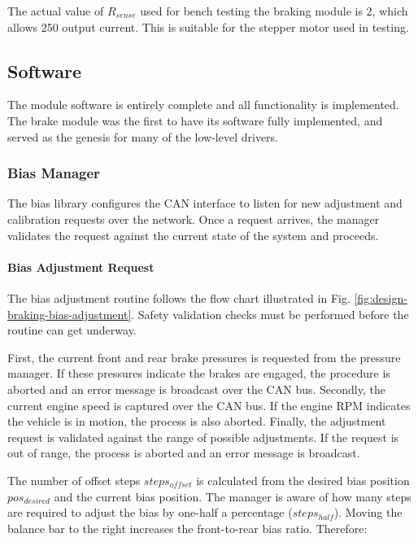 The actual value of $R_{sense}$ used for bench testing the braking module is \unit{2}{\ohm}, which allows \unit{250}{\milli\ampere} output current. This is suitable for the stepper motor used in testing.

\subsection{Software}

The module software is entirely complete and all functionality is implemented. The brake module was the first to have its software fully implemented, and served as the genesis for many of the low-level drivers.

\subsubsection{Bias Manager}

The bias library configures the CAN interface to listen for new adjustment and calibration requests over the network. Once a request arrives, the manager validates the request against the current state of the system and proceeds. 

\paragraph{Bias Adjustment Request}
\label{sec:impl_braking_bar}

The bias adjustment routine follows the flow chart illustrated in Fig. \ref{fig:design-braking-bias-adjustment}. Safety validation checks must be performed before the routine can get underway. 

First, the current front and rear brake pressures is requested from the pressure manager. If these pressures indicate the brakes are engaged, the procedure is aborted and an error message is broadcast over the CAN bus. Secondly, the current engine speed is captured over the CAN bus. If the engine RPM indicates the vehicle is in motion, the process is also aborted. Finally, the adjustment request is validated against the range of possible adjustments. If the request is out of range, the process is aborted and an error message is broadcast.

The number of offset steps $steps_{offset}$ is calculated from the desired bias position $pos_{desired}$ and the current bias position. The manager is aware of how many steps are required to adjust the bias by one-half a percentage ($steps_{half}$). Moving the balance bar to the right increases the front-to-rear bias ratio. Therefore:


